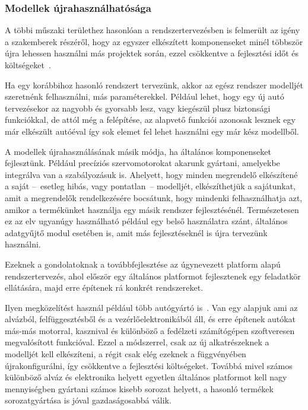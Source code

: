         \subsubsection{Modellek újrahasználhatósága}
        A többi műszaki területhez hasonlóan a rendszertervezésben is felmerült az igény a szakemberek részéről, hogy az egyszer elkészített komponenseket minél többször újra lehessen használni más projektek során, ezzel csökkentve a fejlesztési időt és költségeket~\cite{Bajaj_2022}.
        
        Ha egy korábbihoz hasonló rendszert tervezünk, akkor az egész rendszer modelljét szeretnénk felhasználni, más paraméterekkel. Például lehet, hogy egy új autó tervezésekor az nagyobb és gyorsabb lesz, vagy kiegészül plusz biztonsági funkciókkal, de attól még a felépítése, az alapvető funkciói azonosak lesznek egy már elkészült autóéval így sok elemet fel lehet használni egy már kész modellből.

        A modellek újrahasználásának másik módja, ha általános komponenseket fejlesztünk. Például precíziós szervomotorokat akarunk gyártani, amelyekbe integrálva van a szabályozásuk is. Ahelyett, hogy minden megrendelő elkészítené a saját --~esetleg hibás, vagy pontatlan~-- modelljét, elkészíthetjük a sajátunkat, amit a megrendelők rendelkezésére bocsátunk, hogy mindenki felhasználhatja azt, amikor a termékünket használja egy másik rendszer fejlesztésénél.
        Természetesen ez az elv ugyanúgy használható például egy belső használatra szánt, általános adatgyűjtő modul esetében is, amit más fejlesztéseknél is újra tervezünk használni.

        Ezeknek a gondolatoknak a továbbfejlesztése az úgynevezett platform alapú rendszertervezés, ahol először egy általános platformot fejlesztenek egy feladatkör ellátására, majd erre építenek rá konkrét rendszereket.
        
        Ilyen megközelítést használ például több autógyártó is~\cite{Simpson_2006}. Van egy alapjuk ami az alvázból, felfüggesztésből és a vezérlőelektronikából áll, és erre építenek autókat más-más motorral, kasznival és különböző a fedélzeti számítógépen szoftveresen megvalósított funkcióval.
        Ezzel a módszerrel, csak az új alkatrészeknek a modelljét kell elkészíteni, a régit csak elég ezeknek a függvényében újrakonfigurálni, így csökkentve a fejlesztési költségeket. Továbbá mivel számos különböző alváz és elektronika helyett egyetlen általános platformot kell nagy mennyiségben gyártani számos kisebb sorozat helyett, a hasonló termékek sorozatgyártása is jóval gazdaságosabbá válik.
        
